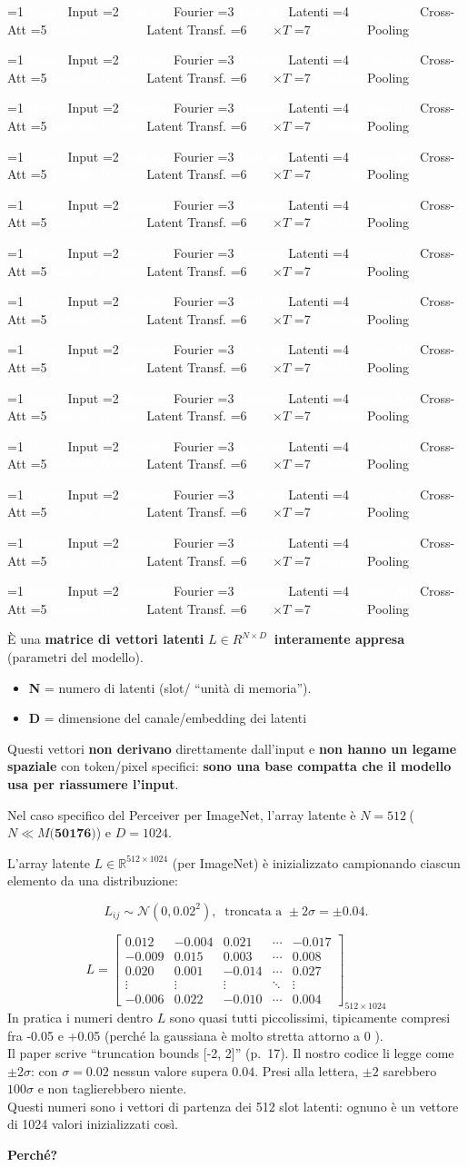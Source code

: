 \documentclass[
  11pt,
]{article}
\newcommand{\pipelinestep}[2]{%
  \ifnum#2=1
    \tikz[baseline=(n.base)]{\node[draw=seccolor, fill=seccolor!15, rounded corners=2pt,
      inner sep=2pt, font=\footnotesize\bfseries] (n) {#1};}%
  \else
    \tikz[baseline=(n.base)]{\node[draw=boxframe, rounded corners=2pt,
      inner sep=2pt, font=\footnotesize] (n) {#1};}%
  \fi
}
\newcommand{\parr}{{\footnotesize\;$\to$\;}}
\newcommand{\pipeline}[1]{%
\begin{tcolorbox}[colback=white, colframe=seccolor!60, boxrule=0.6pt, arc=4pt,
  left=4pt, right=4pt, top=5pt, bottom=5pt, title={\footnotesize\bfseries\color{white} Forward Pass Pipeline}, fonttitle=\footnotesize, coltitle=white, colbacktitle=seccolor!70]
\centering
\pipelinestep{Input}{%
  \ifnum#1=1 1\else 0\fi}%
\parr\pipelinestep{Fourier}{%
  \ifnum#1=2 1\else 0\fi}%
\parr\pipelinestep{Embedding}{%
  \ifnum#1=3 1\else 0\fi}%
\parr\pipelinestep{Latent Array}{%
  \ifnum#1=4 1\else 0\fi}%
\parr\pipelinestep{Cross-Att}{%
  \ifnum#1=5 1\else 0\fi}%
\parr\pipelinestep{Res+MLP}{%
  \ifnum#1=6 1\else 0\fi}%
\\[4pt]
\pipelinestep{Latent Transf.}{%
  \ifnum#1=7 1\else 0\fi}%
\parr\pipelinestep{Res+MLP}{%
  \ifnum#1=8 1\else 0\fi}%
\parr\pipelinestep{$\times T$}{%
  \ifnum#1=9 1\else 0\fi}%
\parr\pipelinestep{Pooling}{%
  \ifnum#1=10 1\else 0\fi}%
\parr\pipelinestep{Classifier}{%
  \ifnum#1=11 1\else 0\fi}%
\parr\pipelinestep{Loss}{%
  \ifnum#1=12 1\else 0\fi}%
\end{tcolorbox}
}
\newcommand{\mystripchip}[3]{%
  \setlength{\fboxsep}{2.8pt}%
  \ifnum#3=#1\relax
    \colorbox{seccolor}{\textcolor{white}{\bfseries #2}}%
  \else
    \colorbox{seccolor!8}{\textcolor{seccolor!55}{#2}}%
  \fi}
\newcommand{\mystriparr}{{\fontsize{8}{8}\selectfont\;\textcolor{seccolor!45}{$\rightarrow$}\;}}
\newcommand{\mystrip}[1]{%
\begin{center}
{\sffamily\fontsize{7.5}{9}\selectfont
\mystripchip{1}{Input}{#1}\mystriparr\mystripchip{2}{Fourier}{#1}\mystriparr\mystripchip{3}{Latenti}{#1}\mystriparr%
\mystripchip{4}{Cross-Att}{#1}\mystriparr\mystripchip{5}{Latent Transf.}{#1}\mystriparr%
\mystripchip{6}{$\times T$}{#1}\mystriparr\mystripchip{7}{Pooling}{#1}}
\end{center}}
\renewcommand{\pipeline}[1]{%
  \ifcase#1\relax
    \mystrip{0}%
    \or\mystrip{1}%
    \or\mystrip{2}%
    \or\mystrip{2}%
    \or\mystrip{3}%
    \or\mystrip{4}%
    \or\mystrip{4}%
    \or\mystrip{5}%
    \or\mystrip{5}%
    \or\mystrip{6}%
    \or\mystrip{7}%
    \or\mystrip{7}%
    \or\mystrip{7}%
  \fi}
\begin{document}
\pipeline{4}

È una \textbf{matrice di vettori latenti} \(L \in R^{N \times D}\ \)
\textbf{interamente appresa} (parametri del modello).

\begin{itemize}
\item
  \textbf{N} = numero di latenti (slot/ ``unità di memoria'').
\item
  \textbf{D} = dimensione del canale/embedding dei latenti
\end{itemize}

Questi vettori \textbf{non derivano} direttamente dall'input e
\textbf{non hanno un legame spaziale} con token/pixel specifici:
\textbf{sono una base compatta che il modello usa per \textbf{riassumere}
l'input}.

Nel caso specifico del Perceiver per ImageNet, l'array
latente è \(N = 512\ \)(\(N \ll M(\mathbf{50176)}\)) e \(D = 1024\).

L'array latente \(L \in \mathbb{R}^{512 \times 1024}\)
(per ImageNet) è inizializzato campionando ciascun elemento da una
distribuzione:

\[L_{ij} \sim \mathcal{N}\left( 0,{0.02}^{2} \right),\ \text{ troncata a } \pm 2\sigma = \pm 0.04.\]

\[
L = \begin{bmatrix}
 0.012  & -0.004 &  0.021 & \cdots & -0.017 \\
-0.009  &  0.015 &  0.003 & \cdots &  0.008 \\
 0.020  &  0.001 & -0.014 & \cdots &  0.027 \\
\vdots  & \vdots & \vdots & \ddots & \vdots \\
-0.006  &  0.022 & -0.010 & \cdots &  0.004
\end{bmatrix}_{512 \times 1024}
\]In
pratica i numeri dentro \(L\) sono quasi tutti piccolissimi, tipicamente
compresi fra -0.05 e +0.05 (perché la gaussiana è molto stretta attorno
a 0 ).\\
Il paper scrive ``truncation bounds [-2, 2]'' (p.~17). Il nostro codice li legge come $\pm 2\sigma$: con $\sigma = 0.02$ nessun valore supera $0.04$. Presi alla lettera, $\pm 2$ sarebbero $100\sigma$ e non taglierebbero niente.\\
Questi numeri sono i vettori di partenza dei 512 slot latenti: ognuno è
un vettore di 1024 valori inizializzati così.

\textbf{Perché?}
\end{document}
